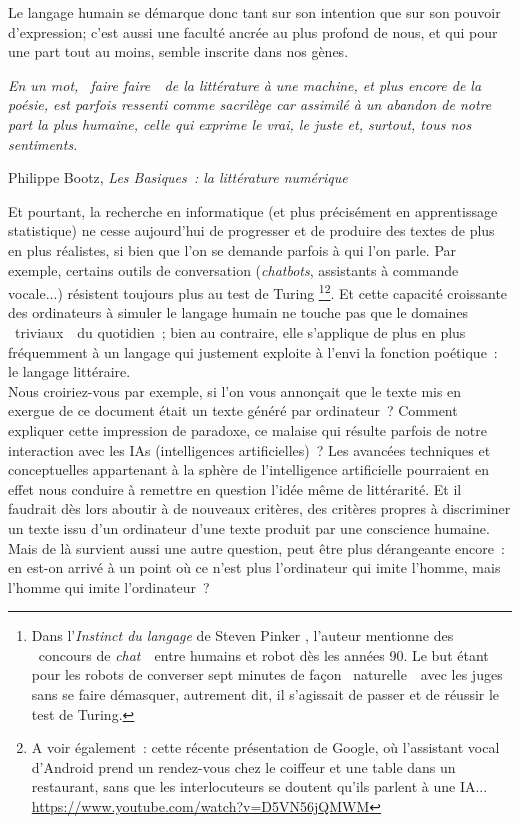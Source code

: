 \documentclass{article}
\newenvironment{citationbox}
{\begin{center}
		\begin{minipage}{.8\textwidth}
		}
		{
		\end{minipage}	
\end{center}
}
\begin{document}
		Le langage humain se démarque donc tant sur son intention que sur son pouvoir d'expression; c'est aussi une faculté ancrée au plus profond de nous, et qui pour une part tout au moins, semble inscrite dans nos gènes\autocite{pinker2008}. 
		\begin{citationbox}
			\textit{En un mot, \guillemotleft~faire faire~\guillemotright~de la littérature à une machine, et plus encore de la poésie, est parfois ressenti comme sacrilège car assimilé à un abandon de notre part la plus humaine, celle qui exprime le vrai, le juste et, surtout, tous nos sentiments.}
			\begin{flushright}
				Philippe Bootz, \textit{Les Basiques~: la littérature numérique} \autocite{bootz2006}
			\end{flushright}
		\end{citationbox}
		Et pourtant, la recherche en informatique (et plus précisément en apprentissage statistique) ne cesse aujourd'hui de progresser et de produire des textes de plus en plus réalistes, si bien que l'on se demande parfois à qui l'on parle. Par exemple, certains outils de conversation (\textit{chatbots}, assistants à commande vocale...) résistent toujours plus au test de Turing \autocite{guilet2017}\footnote{Dans l'\textit{Instinct du langage} de Steven Pinker \autocite{pinker2008}, l'auteur mentionne des \guillemotleft~concours de \textit{chat}~\guillemotright~entre humains et robot dès les années 90. Le but étant pour les robots de converser sept minutes de façon \guillemotleft~naturelle~\guillemotright~avec les juges sans se faire démasquer, autrement dit, il s'agissait de passer et de réussir le test de Turing.}\footnote{A voir également~: cette récente présentation de Google, où l'assistant vocal d'Android prend un rendez-vous chez le coiffeur et une table dans un restaurant, sans que les interlocuteurs se doutent qu'ils parlent à une IA... \href{https://www.youtube.com/watch?v=D5VN56jQMWM}{https://www.youtube.com/watch?v=D5VN56jQMWM}}. Et cette capacité croissante des ordinateurs à simuler le langage humain ne touche pas que le domaines \guillemotleft~triviaux~\guillemotright~du quotidien ; bien au contraire, elle s'applique de plus en plus fréquemment à un langage qui justement exploite à l'envi la fonction poétique~: le langage littéraire.\\
		
		Nous croiriez-vous par exemple, si l'on vous annonçait que le texte mis en exergue de ce document était un texte généré par ordinateur~? Comment expliquer cette impression de paradoxe, ce malaise qui résulte parfois de notre interaction avec les IAs (intelligences artificielles)~? Les avancées techniques et conceptuelles appartenant à la sphère de l'intelligence artificielle pourraient en effet nous conduire à remettre en question l'idée même de littérarité. Et il faudrait dès lors aboutir à de nouveaux critères, des critères propres à discriminer un texte issu d'un ordinateur d'une texte produit par une conscience humaine. Mais de là survient aussi une autre question, peut être plus dérangeante encore~: en est-on arrivé à un point où ce n'est plus l'ordinateur qui imite l'homme, mais l'homme qui imite l'ordinateur~?\\
		
\end{document}
